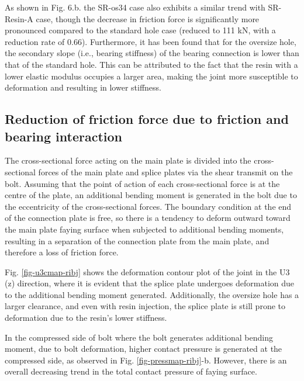 As shown in Fig. 6.b. the SR-os34 case also exhibits a similar trend with SR-Resin-A case, though the decrease in friction force is significantly more pronounced compared to the standard hole case (reduced to 111 kN, with a reduction rate of 0.66). Furthermore, it has been found that for the oversize hole, the secondary slope (i.e., bearing stiffness) of the bearing connection is lower than that of the standard hole. This can be attributed to the fact that the resin with a lower elastic modulus occupies a larger area, making the joint more susceptible to deformation and resulting in lower stiffness.

\subsection{Reduction of friction force due to friction and bearing interaction}

The cross-sectional force acting on the main plate is divided into the cross-sectional forces of the main plate and splice plates via the shear transmit on the bolt. Assuming that the point of action of each cross-sectional force is at the centre of the plate, an additional bending moment is generated in the bolt due to the eccentricity of the cross-sectional forces. The boundary condition at the end of the connection plate is free, so there is a tendency to deform outward toward the main plate faying surface when subjected to additional bending moments, resulting in a separation of the connection plate from the main plate, and therefore a loss of friction force.

Fig. \ref{fig-u3cmap-ribj} shows the deformation contour plot of the joint in the U3 (z) direction, where it is evident that the splice plate undergoes deformation due to the additional bending moment generated. Additionally, the oversize hole has a larger clearance, and even with resin injection, the splice plate is still prone to deformation due to the resin's lower stiffness.

In the compressed side of bolt where the bolt generates additional bending moment, due to bolt deformation, higher contact pressure is generated at the compressed side, as observed in Fig. \ref{fig-pressmap-ribj}-b. However, there is an overall decreasing trend in the total contact pressure of faying surface.

